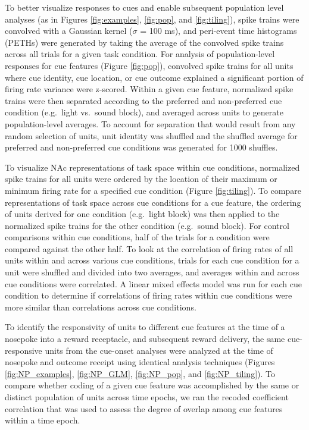 \documentclass[11pt]{article}
\begin{document}
{To better visualize responses to cues and enable subsequent population
level analyses (as in Figures \ref{fig:examples}, \ref{fig:pop}, and
\ref{fig:tiling}), spike trains were convolved with a Gaussian kernel
($\sigma$ = 100 ms), and peri-event time histograms (PETHs) were
generated by taking the average of the convolved spike trains across all
trials for a given task condition. For analysis of population-level
responses for cue features (Figure \ref{fig:pop}), convolved spike
trains for all units where cue identity, cue location, or cue outcome
explained a significant portion of firing rate variance were
z-scored. Within a given cue feature, normalized spike trains were
then separated according to the preferred and non-preferred cue
condition (e.g.\ light vs.\ sound block), and averaged across units to
generate population-level averages. To account for separation that
would result from any random selection of units, unit identity was
shuffled and the shuffled average for preferred and non-preferred cue
conditions was generated for 1000 shuffles.

To visualize NAc representations of task space within cue conditions,
normalized spike trains for all units were ordered by the location of
their maximum or minimum firing rate for a specified cue condition
(Figure \ref{fig:tiling}). To compare representations of task space
across cue conditions for a cue feature, the ordering of units derived
for one condition (e.g.\ light block) was then applied to the
normalized spike trains for the other condition (e.g.\ sound
block). For control comparisons within cue conditions, half of the
trials for a condition were compared against the other half. To look
at the correlation of firing rates of all units within and across
various cue conditions, trials for each cue condition for a unit were
shuffled and divided into two averages, and averages within and across
cue conditions were correlated. A linear mixed effects model was run
for each cue condition to determine if correlations of firing rates
within cue conditions were more similar than correlations across cue
conditions.

To identify the responsivity of units to different cue features at the time of a nosepoke into a reward receptacle, and subsequent reward delivery, the same cue-responsive units from the cue-onset analyses were analyzed at the time of nosepoke and outcome receipt using identical analysis techniques (Figures \ref{fig:NP_examples}, \ref{fig:NP_GLM}, \ref{fig:NP_pop}, and \ref{fig:NP_tiling}). To compare whether coding of a given cue feature was accomplished by the same or distinct population of units across time epochs, we ran the recoded coefficient correlation that was used to assess the degree of overlap among cue features within a time epoch.

}
\end{document}

